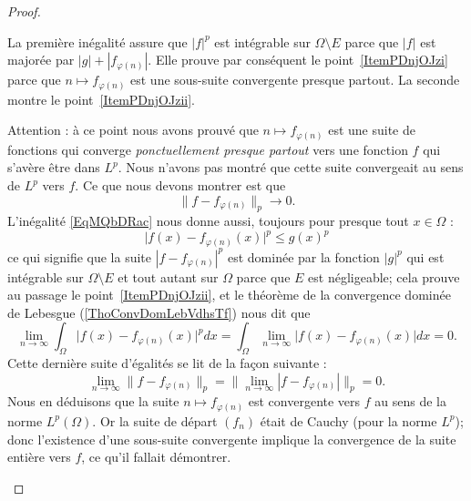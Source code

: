 \begin{proof}
\begin{subproof}
        La première inégalité assure que \( | f |^p\) est intégrable sur \( \Omega\setminus E\) parce que \( | f |\) est majorée par \( | g |+| f_{\varphi(n)} |\). Elle prouve par conséquent le point~\ref{ItemPDnjOJzi} parce que \(n\mapsto f_{\varphi(n)}\) est une sous-suite convergente presque partout. La seconde montre le point~\ref{ItemPDnjOJzii}.

        Attention : à ce point nous avons prouvé que \( n\mapsto f_{\varphi(n)}\) est une suite de fonctions qui converge \emph{ponctuellement presque partout} vers une fonction \( f\) qui s'avère être dans \( L^p\). Nous n'avons pas montré que cette suite convergeait au sens de \( L^p\) vers \( f\). Ce que nous devons montrer est que
        \begin{equation}    \label{EqJLfnEvj}
            \| f-f_{\varphi(n)} \|_p\to 0.
        \end{equation}
        L'inégalité \eqref{EqMQbDRac} nous donne aussi, toujours pour presque tout \( x\in \Omega\) :
        \begin{equation}
            \big| f(x)-f_{\varphi(n)}(x) \big|^p\leq g(x)^p
        \end{equation}
        ce qui signifie que la suite \(    | f-f_{\varphi(n)} |^p    \) est dominée par la fonction \( | g |^p\) qui est intégrable sur \( \Omega\setminus E\) et tout autant sur \( \Omega\) parce que \( E\) est négligeable; cela prouve au passage le point~\ref{ItemPDnjOJzii}, et le théorème de la convergence dominée de Lebesgue (\ref{ThoConvDomLebVdhsTf}) nous dit que
        \begin{equation}
            \lim_{n\to \infty} \int_{\Omega} \big| f(x)-f_{\varphi(n)}(x) \big|^pdx=\int_{\Omega}\lim_{n\to \infty} \big| f(x)-f_{\varphi(n)}(x) \big|dx=0.
        \end{equation}
        Cette dernière suite d'égalités se lit de la façon suivante :
        \begin{equation}
            \lim_{n\to \infty} \| f-f_{\varphi(n)} \|_p=\big\| \lim_{n\to \infty} | f-f_{\varphi(n)} | \big\|_p=0.
        \end{equation}
        Nous en déduisons que la suite \( n\mapsto f_{\varphi(n)}\) est convergente vers \( f\) au sens de la norme \( L^p(\Omega)\). Or la suite de départ \( (f_n)\) était de Cauchy (pour la norme \( L^p\)); donc l'existence d'une sous-suite convergente implique la convergence de la suite entière vers \( f\), ce qu'il fallait démontrer.
    \end{subproof}
\end{proof}

